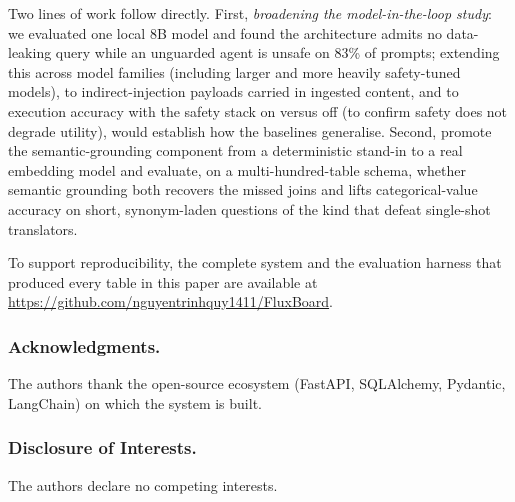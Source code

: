 \documentclass[runningheads]{llncs}
\begin{document}
Two lines of work follow directly. First, \emph{broadening the model-in-the-loop study}: we evaluated one local 8B model and found the architecture admits no data-leaking query while an unguarded agent is unsafe on 83\% of prompts; extending this across model families (including larger and more heavily safety-tuned models), to indirect-injection payloads carried in ingested content, and to execution accuracy with the safety stack on versus off (to confirm safety does not degrade utility), would establish how the baselines generalise. Second, promote the semantic-grounding component from a deterministic stand-in to a real embedding model and evaluate, on a multi-hundred-table schema, whether semantic grounding both recovers the missed joins and lifts categorical-value accuracy on short, synonym-laden questions of the kind that defeat single-shot translators.

To support reproducibility, the complete system and the evaluation harness that produced every table in this paper are available at \url{https://github.com/nguyentrinhquy1411/FluxBoard}.

\subsubsection*{Acknowledgments.} The authors thank the open-source ecosystem (FastAPI, SQLAlchemy, Pydantic, LangChain) on which the system is built.

\subsubsection*{Disclosure of Interests.} The authors declare no competing interests.
\end{document}
